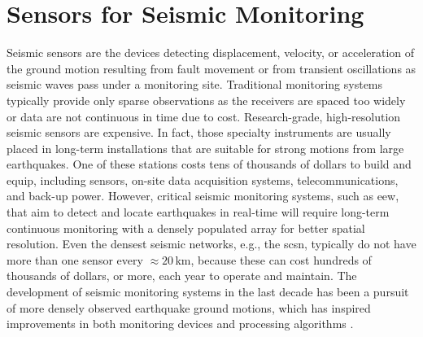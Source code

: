 \documentclass{article}
\begin{document}
\section{Sensors for Seismic Monitoring}
\label{sec:sensor}
%
Seismic sensors are the devices detecting displacement, velocity, or acceleration of the ground motion resulting from fault movement or from transient oscillations as seismic waves pass under a monitoring site.
Traditional monitoring systems typically provide only sparse observations as the receivers are spaced too widely or data are not continuous in time due to cost.
Research-grade, high-resolution seismic sensors are expensive.
In fact, those specialty instruments are usually placed in long-term installations that are suitable for strong motions from large earthquakes.
One of these stations costs tens of thousands of dollars to build and equip, including sensors, on-site data acquisition systems, telecommunications, and back-up power.
However, critical seismic monitoring systems, such as \gls{eew}, that aim to detect and locate earthquakes in real-time will require long-term continuous monitoring with a densely populated array for better spatial resolution.
Even the densest seismic networks, e.g., the \gls{scsn}, typically do not have more than one sensor every $\approx20$\,km, because these can cost hundreds of thousands of dollars, or more, each year to operate and maintain.
The development of seismic monitoring systems in the last decade has been a pursuit of more densely observed earthquake ground motions, which has inspired improvements in both monitoring devices \autocite{etienne2016simultaneous} and processing algorithms \autocite{inbal2015imaging,riahi2015seismic}.
\end{document}
